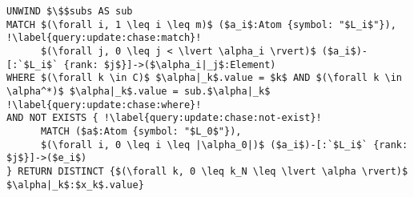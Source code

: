 \begin{lstlisting}[mathescape, name=qchase, language=cypher, caption=Format des requêtes $Q_{chase}$, label={algo:update:chase:query}, escapechar=!, float, floatplacement=htb]
UNWIND $\$$subs AS sub
MATCH $(\forall i, 1 \leq i \leq m)$ ($a_i$:Atom {symbol: "$L_i$"}), !\label{query:update:chase:match}!
      $(\forall j, 0 \leq j < \lvert \alpha_i \rvert)$ ($a_i$)-[:`$L_i$` {rank: $j$}]->($\alpha_i|_j$:Element)
WHERE $(\forall k \in C)$ $\alpha|_k$.value = $k$ AND $(\forall k \in \alpha^*)$ $\alpha|_k$.value = sub.$\alpha|_k$ !\label{query:update:chase:where}!
AND NOT EXISTS { !\label{query:update:chase:not-exist}!
      MATCH ($a$:Atom {symbol: "$L_0$"}),
      $(\forall i, 0 \leq i \leq |\alpha_0|)$ ($a_i$)-[:`$L_i$` {rank: $j$}]->($e_i$)
} RETURN DISTINCT {$(\forall k, 0 \leq k_N \leq \lvert \alpha \rvert)$ $\alpha|_k$:$x_k$.value}
\end{lstlisting}


